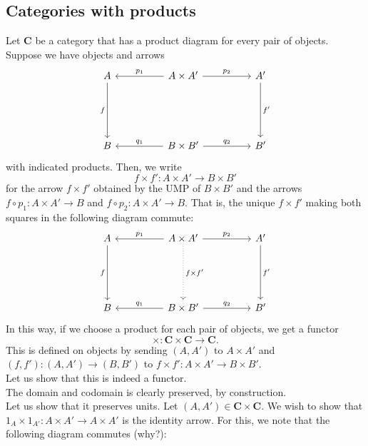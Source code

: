 \subsection{Categories with products}
Let $\mathbf{C}$ be a category that has a product diagram for every pair of objects. Suppose we have objects and arrows
\begin{equation*} 
	\begin{tikzcd}
		A \arrow[ddd, "f"'] && A \times A' \arrow[ll, "p_1"'] \arrow[rr, "p_2"] && A' \arrow[ddd, "f'"]\\
		&&&&\\&&&&\\
		B && B \times B' \arrow[ll, "q_1"'] \arrow[rr, "q_2"] && B'
	\end{tikzcd}
\end{equation*}
with indicated products. Then, we write
\begin{equation*} 
	f \times f' : A \times A' \to B \times B'
\end{equation*}
for the arrow $f\times f'$ obtained by the UMP of $B \times B'$ and the arrows $f\circ p_1:A\times A' \to B$ and $f\circ p_2:A\times A' \to B.$ That is, the unique $f\times f'$ making both squares in the following diagram commute:
\begin{equation*} 
	\begin{tikzcd}
		A \arrow[ddd, "f"'] && A \times A' \arrow[ll, "p_1"'] \arrow[rr, "p_2"] \arrow[ddd, "f\times f'", dotted] && A' \arrow[ddd, "f'"]\\
		&&&&\\&&&&\\
		B && B \times B' \arrow[ll, "q_1"'] \arrow[rr, "q_2"] && B'
	\end{tikzcd}
\end{equation*}
In this way, if we choose a product for each pair of objects, we get a functor
\begin{equation*} 
	\times : \mathbf{C} \times \mathbf{C} \to \mathbf{C}.
\end{equation*}
This is defined on objects by sending $(A, A')$ to $A \times A'$ and $(f, f'):(A, A') \to (B, B')$ to $f\times f':A \times A' \to B \times B'.$\\
Let us show that this is indeed a functor.\\
The domain and codomain is clearly preserved, by construction.\\
Let us show that it preserves units. Let $(A, A') \in \mathbf{C} \times \mathbf{C}.$ We wish to show that $1_A\times 1_{A'}:A\times A' \to A\times A'$ is the identity arrow. For this, we note that the following diagram commutes (why?):
